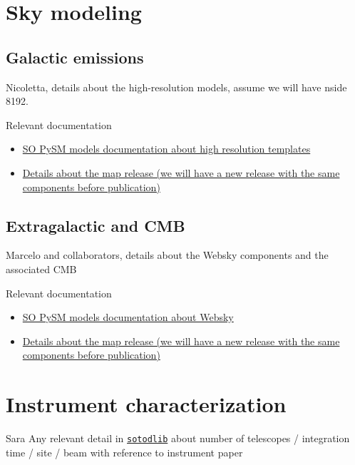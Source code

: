 \documentclass{article}
\begin{document}
\section{Sky modeling}

\subsection{Galactic emissions}

Nicoletta, details about the high-resolution models, assume we will have nside 8192. 

Relevant documentation
\begin{itemize}
\item \href{https://so-pysm-models.readthedocs.io/en/latest/highres_templates.html}{SO PySM models documentation about high resolution templates}
\item \href{https://github.com/simonsobs/map_based_simulations/tree/master/201906_highres_foregrounds_extragalactic_tophat}{Details about the map release (we will have a new release with the same components before publication)}
\end{itemize}

\subsection{Extragalactic and CMB}

Marcelo and collaborators, details about the Websky components and the associated CMB 

Relevant documentation
\begin{itemize}
\item \href{https://so-pysm-models.readthedocs.io/en/latest/models.html#websky}{SO PySM models documentation about Websky}
\item \href{https://github.com/simonsobs/map_based_simulations/tree/master/201906_highres_foregrounds_extragalactic_tophat}{Details about the map release (we will have a new release with the same components before publication)}
\end{itemize}

\section{Instrument characterization}

Sara
Any relevant detail in \href{https://github.com/simonsobs/sotodlib/}{\texttt{sotodlib}} about number of telescopes / integration time / site / beam with reference to instrument paper
\end{document}
